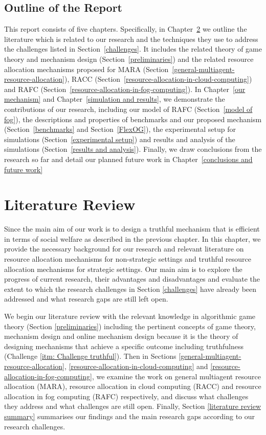 \documentclass[11pt]{phdthesis}
\begin{document}
\section{Outline of the Report} \label{outline}
This report consists of five chapters. Specifically, in Chapter~\ref{literature review} we outline the literature which is related to our research and the techniques they use to address the challenges listed in Section~\ref{challenges}. It includes the related theory of game theory and mechanism design (Section~\ref{preliminaries}) and the related resource allocation mechanisms proposed for MARA (Section~\ref{general-multiagent-resource-allocation}), RACC (Section~\ref{resource-allocation-in-cloud-computing}) and RAFC (Section~\ref{resource-allocation-in-fog-computing}). In Chapter~\ref{our mechanism} and Chapter~\ref{simulation and results}, we demonstrate the contributions of our research, including our model of RAFC (Section~\ref{model of fog}), the descriptions and properties of benchmarks and our proposed mechanism (Section~\ref{benchmarks} and Section~\ref{FlexOG}), the experimental setup for simulations (Section~\ref{experimental setup}) and results and analysis of the simulations (Section~\ref{results and analysis}). Finally, we draw conclusions from the research so far and detail our planned future work in Chapter~\ref{conclusions and future work}


\chapter{Literature Review} \label{literature review}

Since the main aim of our work is to design a truthful mechanism that is efficient in terms of social welfare as described in the previous chapter. In this chapter, we provide the necessary background for our research and relevant literature on resource allocation mechanisms for non-strategic settings and truthful resource allocation mechanisms for strategic settings. Our main aim is to explore the progress of current research, their advantages and disadvantages and evaluate the extent to which the research challenges in Section \ref{challenges} have already been addressed and what research gaps are still left open.

We begin our literature review with the relevant knowledge in algorithmic game theory (Section \ref{preliminaries}) including the pertinent concepts of game theory, mechanism design and online mechanism design because it is the theory of designing mechanisms that achieve a specific outcome including truthfulness (Challenge \ref{itm: Challenge truthful}). Then in Sections \ref{general-multiagent-resource-allocation}, \ref{resource-allocation-in-cloud-computing} and \ref{resource-allocation-in-fog-computing}, we examine the work on general multiagent resource allocation (MARA), resource allocation in cloud computing (RACC) and resource allocation in fog computing (RAFC) respectively, and discuss what challenges they address and what challenges are still open. Finally, Section \ref{literature review summary} summarises our findings and the main research gaps according to our research challenges.
\end{document}
